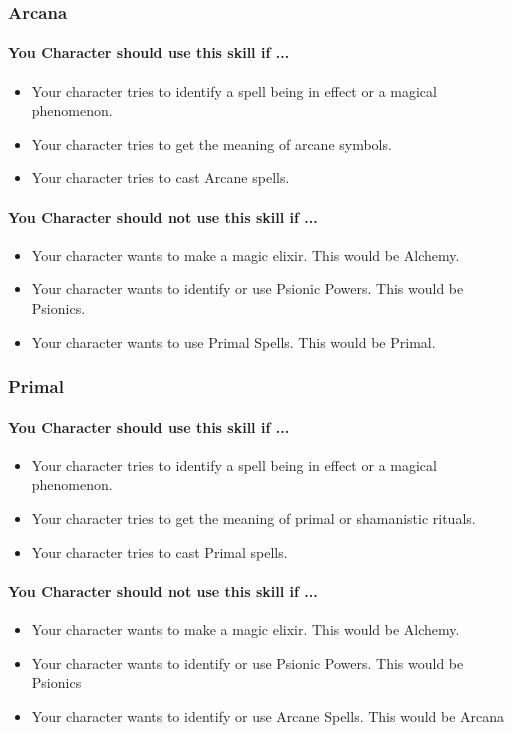 \begin{multicols}{2}
\subsubsection{Arcana}\label{skill:arcana}
\paragraph{You Character should use this skill if ...}
\begin{itemize}
    \item Your character tries to identify a spell being in effect or a magical
        phenomenon.
    \item Your character tries to get the meaning of arcane symbols.
    \item Your character tries to cast Arcane spells.
\end{itemize}
\paragraph{You Character should not use this skill if ...}
\begin{itemize}
    \item Your character wants to make a magic elixir.  This would be Alchemy.
    \item Your character wants to identify or use Psionic Powers. This would be
        Psionics.
    \item Your character wants to use Primal Spells. This would be Primal.
\end{itemize}

\subsubsection{Primal}\label{skill:primal}
\paragraph{You Character should use this skill if ...}
\begin{itemize}
    \item Your character tries to identify a spell being in effect or a magical
        phenomenon.
    \item Your character tries to get the meaning of primal or shamanistic rituals.
    \item Your character tries to cast Primal spells.
\end{itemize}
\paragraph{You Character should not use this skill if ...}
\begin{itemize}
    \item Your character wants to make a magic elixir.  This would be Alchemy.
    \item Your character wants to identify or use Psionic Powers. This would be
        Psionics
    \item Your character wants to identify or use Arcane Spells. This would be
        Arcana
\end{itemize}


\end{multicols}
